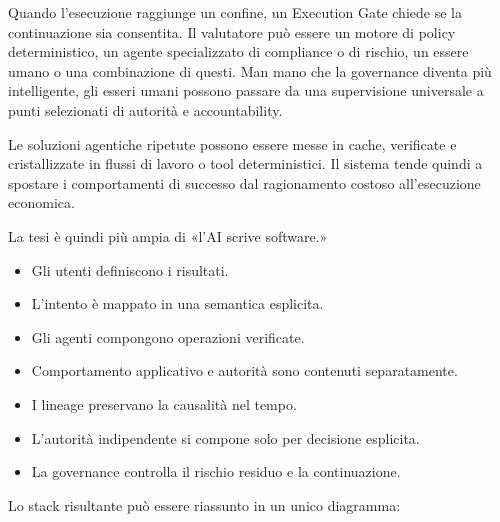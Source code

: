 \documentclass[10pt,oneside,openany]{book}
\begin{document}
Quando l'esecuzione raggiunge un confine, un Execution Gate chiede se la continuazione sia consentita. Il valutatore può essere un motore di policy deterministico, un agente specializzato di compliance o di rischio, un essere umano o una combinazione di questi. Man mano che la governance diventa più intelligente, gli esseri umani possono passare da una supervisione universale a punti selezionati di autorità e accountability.

Le soluzioni agentiche ripetute possono essere messe in cache, verificate e cristallizzate in flussi di lavoro o tool deterministici. Il sistema tende quindi a spostare i comportamenti di successo dal ragionamento costoso all'esecuzione economica.

\noindent\begin{minipage}{\linewidth}
La tesi è quindi più ampia di «l'AI scrive software.»

{\sffamily
\begin{itemize}\setlength{\itemsep}{1pt}\setlength{\parskip}{0pt}
\item Gli utenti definiscono i risultati.
\item L'intento è mappato in una semantica esplicita.
\item Gli agenti compongono operazioni verificate.
\item Comportamento applicativo e autorità sono contenuti separatamente.
\item I lineage preservano la causalità nel tempo.
\item L'autorità indipendente si compone solo per decisione esplicita.
\item La governance controlla il rischio residuo e la continuazione.
\end{itemize}}
\end{minipage}
\vspace{4pt}

Lo stack risultante può essere riassunto in un unico diagramma:
\end{document}
